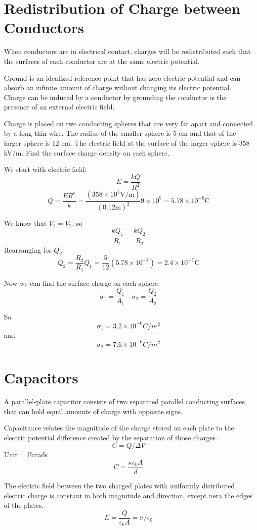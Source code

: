 \documentclass[../em.tex]{subfiles}
\begin{document}
\section{Redistribution of Charge between Conductors}
When conductors are in electrical contact, charges will be redistributed such that the surfaces of each conductor are at the same electric potential.

Ground is an idealized reference point that has zero electric potential and can absorb an 
infinite amount of charge without changing its electric potential. Charge can be induced by a conductor by grounding the conductor is the presence of an external electric field.
\begin{example}
    Charge is placed on two conducting spheres that are very far apart and connected by a long thin wire. 
    The radius of the smaller sphere is 5 cm and that of the larger sphere is 12 cm. The electric field at the 
    surface of the larger sphere is 358 kV/m. Find the surface charge density on each sphere.

    We start with electric field:
    \[E = \frac{kQ}{R^2}\] 
    \[Q = \frac{ER^2}{k}=\frac{(358\times 10^3 \text{V/m})}{(0.12\text{m})^2}{9\times 10^9}= 5.78\times 10^{-8}\text{C}\]

    We know that $V_1 = V_2$, so 
    \[\frac{kQ_1}{R_1}=\frac{kQ_2}{R_2}\] 
    Rearranging for $Q_2$:
    \[Q_2=\frac{R_2}{R_1}Q_1 = \frac{5}{12}(5.78\times10^{-7})=2.4\times10^{-7}\text{C}\]

    Now we can find the surface charge on each sphere. 
    \[\sigma_1=\frac{Q_1}{A_1} \quad \sigma_2 = \frac{Q_2}{A_2}\]

    So \[\sigma_1 = 3.2\times 10^{-6} C/m^2\]
    and \[\sigma_2 = 7.6\times 10^{-6} C/m^2\] 
\end{example}


\section{Capacitors}
A parallel-plate capacitor consists of two separated parallel conducting surfaces 
that can hold equal amounts of charge with opposite signs.

Capacitance relates the magnitude of the charge stored on each plate to the electric 
potential difference created by the separation of those charges.
\[C = Q/\Delta V\] 
Unit = Farads
\[C = \frac{\kappa \epsilon_0 A}{d}\]

The electric field between the two charged plates with uniformly distributed 
electric charge is constant in both magnitude and direction, except nera the edges of the plates.
\[E = \frac{Q}{\epsilon_0 A} = \sigma/\epsilon_0\]
\end{document}
